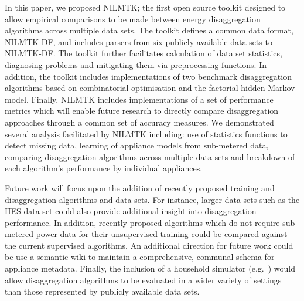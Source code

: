 \documentclass{sig-alternate}
\begin{document}
\noindent
In this paper, we proposed NILMTK; the first open source toolkit designed to allow empirical comparisons to be made between energy disaggregation algorithms across multiple data sets. The toolkit defines a common data format, NILMTK-DF, and includes parsers from six publicly available data sets to NILMTK-DF. The toolkit further facilitates calculation of data set statistics, diagnosing problems and mitigating them via preprocessing functions. In addition, the toolkit includes implementations of two benchmark disaggregation algorithms based on combinatorial optimisation and the factorial hidden Markov model. Finally, NILMTK includes implementations of a set of performance metrics which will enable future research to directly compare disaggregation approaches through a common set of accuracy measures. We demonstrated several analysis facilitated by NILMTK including: use of statistics functions to detect missing data, learning of appliance models from sub-metered data, comparing disaggregation algorithms across multiple data sets and breakdown of each algorithm's performance by individual appliances.

Future work will focus upon the addition of recently proposed training and disaggregation algorithms and data sets. For instance, larger data sets such as the HES data set could also provide additional insight into disaggregation performance.
In addition, recently proposed algorithms which do not require sub-metered power data for their unsupervised training could be compared against the current supervised algorithms.
An additional direction for future work could be use a semantic wiki to maintain a comprehensive, communal schema for appliance metadata.
Finally, the inclusion of a household simulator (e.g.\ \cite{liang_2010}) would allow disaggregation algorithms to be evaluated in a wider variety of settings than those represented by publicly available data sets.
\end{document}
